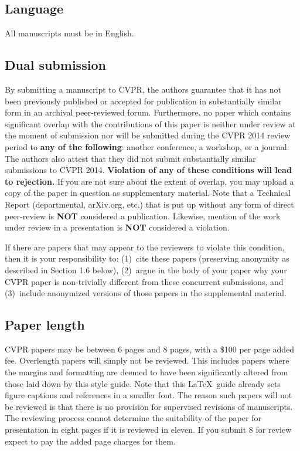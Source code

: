 \documentclass[10pt,twocolumn,letterpaper]{article}
\begin{document}
\subsection{Language}

All manuscripts must be in English.

\subsection{Dual submission}

By submitting a manuscript to CVPR, the authors guarantee that it has
not been previously published or accepted for publication in substantially
similar form in an archival peer-reviewed forum. Furthermore, no paper which
contains significant overlap with the contributions of this paper is neither
under review at the moment of submission nor will be submitted during the
CVPR 2014 review period to {\bf any of the following}: another conference,
a workshop, or a journal. The authors also attest that they did not submit
substantially similar submissions to CVPR 2014. {\bf Violation of any of
these conditions will lead to rejection.} If you are not sure about the
extent of overlap, you may upload a copy of the paper in question as
supplementary material. Note that a Technical Report (departmental,
arXiv.org, etc.) that is put up without any form of direct peer-review is
{\bf NOT} considered a publication. Likewise, mention of the work under
review in a presentation is {\bf NOT} considered a violation.

If there are papers that may appear to the reviewers
to violate this condition, then it is your responsibility to: (1)~cite
these papers (preserving anonymity as described in Section 1.6 below),
(2)~argue in the body of your paper why your CVPR paper is non-trivially
different from these concurrent submissions, and (3)~include anonymized
versions of those papers in the supplemental material.

\subsection{Paper length}
CVPR papers may be between 6 pages and 8 pages, with a \$100 per page added
fee.  Overlength papers will simply not be reviewed.  This includes papers
where the margins and formatting are deemed to have been significantly
altered from those laid down by this style guide.  Note that this
\LaTeX\ guide already sets figure captions and references in a smaller font.
The reason such papers will not be reviewed is that there is no provision for
supervised revisions of manuscripts.  The reviewing process cannot determine
the suitability of the paper for presentation in eight pages if it is
reviewed in eleven.  If you submit 8 for review expect to pay the added page
charges for them. 
\end{document}

